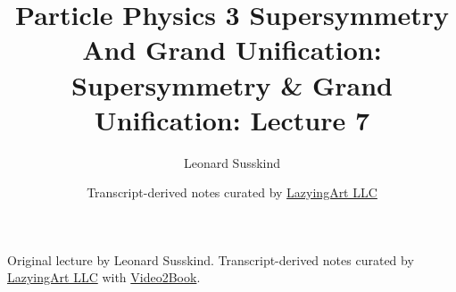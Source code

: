 \documentclass[11pt,oneside]{book}
\begin{document}
\frontmatter
\title{Particle Physics 3 Supersymmetry And Grand Unification: Supersymmetry \& Grand Unification: Lecture 7}
\author{Leonard Susskind}
\date{Transcript-derived notes curated by \href{https://lazying.art}{LazyingArt LLC}}
\maketitle
\begin{center}
\small Original lecture by Leonard Susskind. Transcript-derived notes curated by \href{https://lazying.art}{LazyingArt LLC} with \href{https://github.com/lachlanchen/Video2Book}{Video2Book}.
\end{center}
\clearpage
\mainmatter

\end{document}
